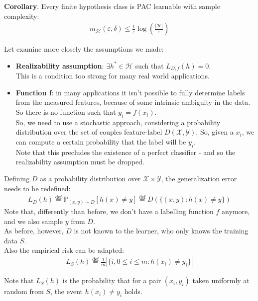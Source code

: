 \documentclass[../template.tex]{subfiles}
\begin{document}
\textbf{Corollary}. Every finite hypothesis class is PAC learnable with sample complexity:
\begin{align*}
    m_{\mathcal{H}}(\varepsilon, \delta) \leq \frac{1}{\varepsilon} \log \left(\frac{|\mathcal{H}|}{\varepsilon} \right) 
\end{align*} 
 
Let examine more closely the assumptions we made:
\begin{itemize}
    \item \textbf{Realizability assumption}: $\exists h^* \in \mathcal{H}$ such that $L_{D,f}(h) = 0$.\\
    This is a condition too strong for many real world applications.
    \item \textbf{Function f}: in many applications it isn't possible to fully determine labels from the measured features, because of some intrinsic ambiguity in the data. So there is no function such that $y_i = f(x_i)$.\\
    So, we need to use a stochastic approach, considering a probability distribution over the set of couples feature-label $D(\mathcal{X}, \mathcal{Y})$. So, given a $x_i$, we can compute a certain probability that the label will be $y_i$.\\
    Note that this precludes the existence of a perfect classifier - and so the realizability assumption must be dropped.
\end{itemize}

Defining $D$ as a probability distribution over $\mathcal{X} \times \mathcal{Y}$, the generalization error needs to be redefined:
\begin{align*}
    L_{D}(h) \overset{\mathrm{def} }{=} \mathbb{P}_{(x,y) \sim D}[h(x) \neq y] \overset{\mathrm{def} }{=} D(\{(x,y)\colon h(x) \neq y\}) 
\end{align*}  
Note that, differently than before, we don't have a labelling function $f$ anymore, and we also sample $y$ from $D$.\\
As before, however, $D$ is not known to the learner, who only knows the training data $S$.\\

Also the empirical risk can be adapted:
\begin{align*}
    L_S(h) \overset{\mathrm{def} }{=}  \frac{1}{m}|\{i,0 \leq i \leq m\colon h(x_i) \neq y_i\}| 
\end{align*}

Note that $L_S(h)$ is the probability that for a pair $(x_i, y_i)$ taken uniformly at random from $S$, the event $h(x_i) \neq y_i$ holds.
\end{document}

